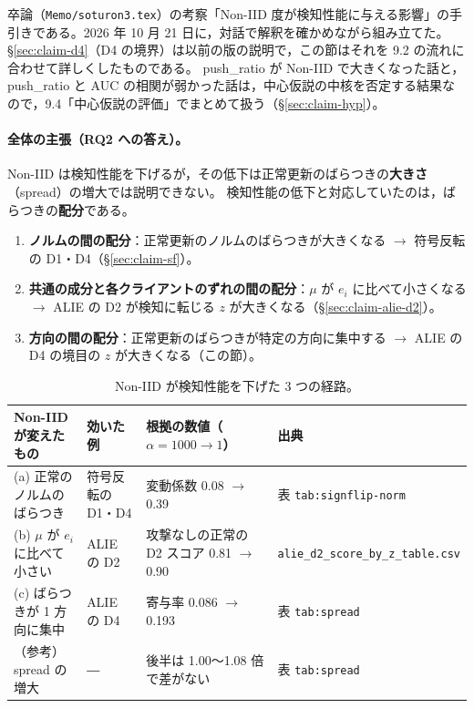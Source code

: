 \documentclass[a4j, dvipdfmx]{jsarticle}  %
\begin{document}
卒論（\texttt{Memo/soturon3.tex}）の考察「Non-IID 度が検知性能に与える影響」の手引きである。2026 年 10 月 21 日に，対話で解釈を確かめながら組み立てた。
\S\ref{sec:claim-d4}（D4 の境界）は以前の版の説明で，この節はそれを 9.2 の流れに合わせて詳しくしたものである。
push\_ratio が Non-IID で大きくなった話と，push\_ratio と AUC の相関が弱かった話は，中心仮説の中核を否定する結果なので，9.4「中心仮説の評価」でまとめて扱う（\S\ref{sec:claim-hyp}）。

\paragraph{全体の主張（RQ2 への答え）。}
Non-IID は検知性能を下げるが，その低下は正常更新のばらつきの\textbf{大きさ}（spread）の増大では説明できない。
検知性能の低下と対応していたのは，ばらつきの\textbf{配分}である。
\begin{enumerate}[label=(\alph*)]
  \item \textbf{ノルムの間の配分}：正常更新のノルムのばらつきが大きくなる $\rightarrow$ 符号反転の D1・D4（\S\ref{sec:claim-sf}）。
  \item \textbf{共通の成分と各クライアントのずれの間の配分}：$\mu$ が $e_i$ に比べて小さくなる $\rightarrow$ ALIE の D2 が検知に転じる $z$ が大きくなる（\S\ref{sec:claim-alie-d2}）。
  \item \textbf{方向の間の配分}：正常更新のばらつきが特定の方向に集中する $\rightarrow$ ALIE の D4 の境目の $z$ が大きくなる（この節）。
\end{enumerate}

\begin{table}[H]
\centering
\caption{Non-IID が検知性能を下げた 3 つの経路。}
\label{tab:noniid-paths}
\small
\begin{tabular}{@{}P{3.9cm} P{2.9cm} P{4.2cm} P{4.0cm}@{}}
\toprule
Non-IID が変えたもの & 効いた例 & 根拠の数値（$\alpha = 1000 \rightarrow 1$） & 出典 \\
\midrule
(a) 正常のノルムのばらつき & 符号反転の D1・D4 & 変動係数 0.08 $\rightarrow$ 0.39 & 表 \texttt{tab:signflip-}\allowbreak\texttt{norm} \\
(b) $\mu$ が $e_i$ に比べて小さい & ALIE の D2 & 攻撃なしの正常の D2 スコア 0.81 $\rightarrow$ 0.90 & \texttt{alie\_d2\_score\_}\allowbreak\texttt{by\_z\_table.csv} \\
(c) ばらつきが 1 方向に集中 & ALIE の D4 & 寄与率 0.086 $\rightarrow$ 0.193 & 表 \texttt{tab:spread} \\
\midrule
（参考）spread の増大 & ― & 後半は 1.00〜1.08 倍で差がない & 表 \texttt{tab:spread} \\
\bottomrule
\end{tabular}
\end{table}
\end{document}
